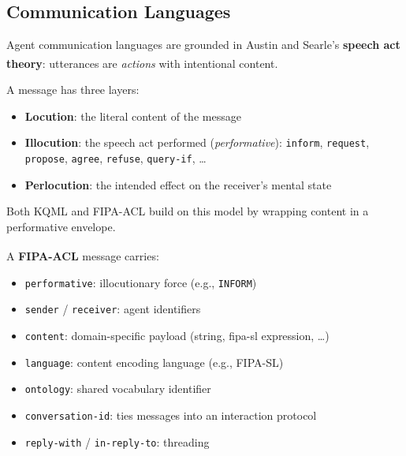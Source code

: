 \subsection{Communication Languages}
\begin{tcbitemize}[ skin=sectionraster ]

    \tcbitem[title=Speech Act Theory, raster multicolumn=3]
    Agent communication languages are grounded in Austin and Searle's
    \textbf{speech act theory}: utterances are \emph{actions} with
    intentional content.\textsuperscript{\cite[][p.~184]{wooldridgeIntroductionMultiAgentSystems2009}}

    A message has three layers:
    \begin{itemize}
        \item \textbf{Locution}: the literal content of the message
        \item \textbf{Illocution}: the speech act performed (\emph{performative}):
              \texttt{inform}, \texttt{request}, \texttt{propose}, \texttt{agree},
              \texttt{refuse}, \texttt{query-if}, \ldots
        \item \textbf{Perlocution}: the intended effect on the receiver's mental state
    \end{itemize}
    Both KQML and FIPA-ACL build on this model by wrapping content in a
    performative envelope.

    \tcbitem[title={FIPA-ACL Message Structure}, raster multicolumn=3]
    A \textbf{FIPA-ACL} message carries:\textsuperscript{\cite[][Ch.~3]{bellifeministeDevelopingMultiAgentSystems2007}}
    \begin{itemize}
        \item \texttt{performative}: illocutionary force (e.g., \texttt{INFORM})
        \item \texttt{sender} / \texttt{receiver}: agent identifiers
        \item \texttt{content}: domain-specific payload (string, fipa-sl expression, \ldots)
        \item \texttt{language}: content encoding language (e.g., FIPA-SL)
        \item \texttt{ontology}: shared vocabulary identifier
        \item \texttt{conversation-id}: ties messages into an interaction protocol
        \item \texttt{reply-with} / \texttt{in-reply-to}: threading
    \end{itemize}


\end{tcbitemize}
